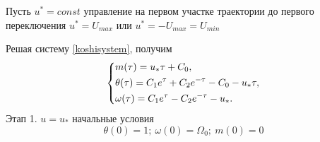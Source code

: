\documentclass[a4paper,14pt]{article}
\theoremstyle{plain} %
\theoremstyle{definition} %
\theoremstyle{remark} %
\begin{document}
{Пусть $u^*=const$ управление на первом участке траектории до первого переключения $u^*=U_{max}$ или $u^*=-U_{max}=U_{min}$

Решая систему \eqref{koshisystem}, получим
\begin{equation}\label{solvekoshi}
    \left\{ {\begin{aligned}
                 & m(\tau) = u_*\tau+C_0, \hfill                              \\
                 & \theta(\tau) = C_1e^\tau+C_2e^{-\tau}-C_0-u_*\tau , \hfill \\
                 & \omega(\tau) = C_1e^\tau-C_2e^{-\tau}-u_*  . \hfill        \\
            \end{aligned}} \right.
\end{equation}
Этап 1. $u=u_*$ начальные условия
\[
    \theta(0)=1;\ \omega(0)=\Omega_0;\ m(0)=0
\]

}
\end{document}
